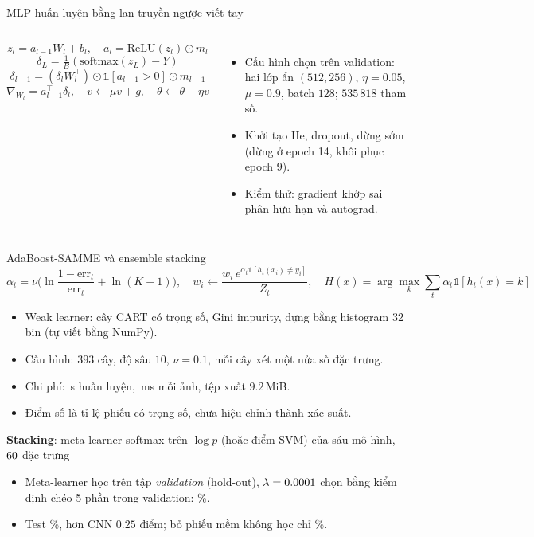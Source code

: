 \documentclass[aspectratio=169,10pt,t]{beamer}
\newcommand{\bul}{\begin{itemize}\setlength{\itemsep}{4pt}}
\newcommand{\eul}{\end{itemize}}
\begin{document}
\begin{frame}{MLP huấn luyện bằng lan truyền ngược viết tay}
  \begin{columns}[T]
    \small
    \[
      z_l=a_{l-1}W_l+b_l,\quad a_l=\mathrm{ReLU}(z_l)\odot m_l
    \]
    \[
      \delta_L=\tfrac1B(\mathrm{softmax}(z_L)-Y)
    \]
    \[
      \delta_{l-1}=(\delta_l W_l^{\top})\odot\mathbb 1[a_{l-1}>0]\odot m_{l-1}
    \]
    \[
      \nabla_{W_l}=a_{l-1}^{\top}\delta_l,\quad v\leftarrow\mu v+g,\quad\theta\leftarrow\theta-\eta v
    \]
    \small
    \bul
      \item Cấu hình chọn trên validation: hai lớp ẩn $(512,256)$, $\eta=0.05$, $\mu=0.9$, batch $128$; $535\,818$ tham số.
      \item Khởi tạo He, dropout, dừng sớm (dừng ở epoch 14, khôi phục epoch 9).
      \item Kiểm thử: gradient khớp sai phân hữu hạn và autograd.
    \eul
  \end{columns}
\end{frame}

\begin{frame}{AdaBoost-SAMME và ensemble stacking}
  \small
  \[
    \alpha_t=\nu\Big(\ln\frac{1-\mathrm{err}_t}{\mathrm{err}_t}+\ln(K-1)\Big),\quad
    w_i\leftarrow\frac{w_i\,e^{\alpha_t\mathbb 1[h_t(x_i)\ne y_i]}}{Z_t},\quad
    H(x)=\arg\max_k\sum_t\alpha_t\mathbb 1[h_t(x)=k]
  \]
  \vspace{-4pt}
  \bul
    \item Weak learner: cây CART có trọng số, Gini impurity, dựng bằng histogram $32$ bin (tự viết bằng NumPy).
    \item Cấu hình: $393$ cây, độ sâu $10$, $\nu=0.1$, mỗi cây xét một nửa số đặc trưng.
    \item Chi phí: \fitADA\,s huấn luyện, \latADA\,ms mỗi ảnh, tệp xuất $9.2$\,MiB.
    \item Điểm số là tỉ lệ phiếu có trọng số, chưa hiệu chỉnh thành xác suất.
  \eul
  \medskip
  \textbf{Stacking}: meta-learner softmax trên $\log p$ (hoặc điểm SVM) của sáu mô hình, $60$ đặc trưng
  \bul
    \item Meta-learner học trên tập \emph{validation} (hold-out), $\lambda=0.0001$ chọn bằng kiểm định chéo 5 phần trong validation: \stackCV\%.
    \item Test \stackAccTest\%, hơn CNN $0.25$ điểm; bỏ phiếu mềm không học chỉ \stackVote\%.
  \eul
\end{frame}
\end{document}
